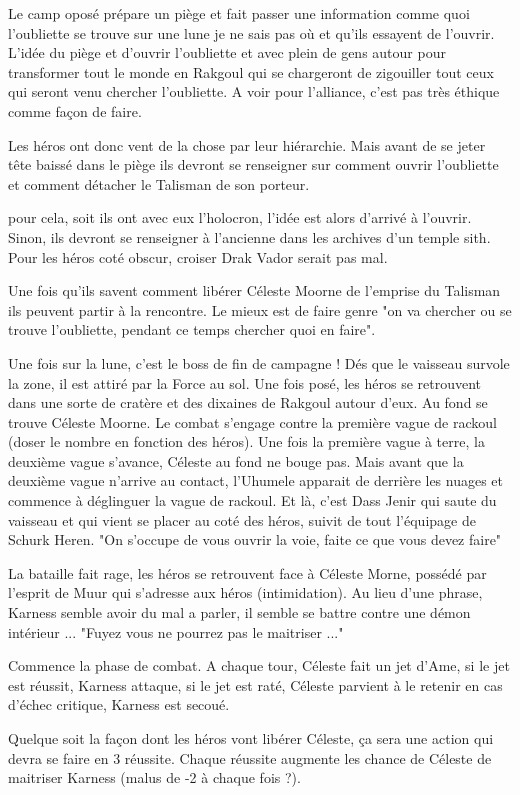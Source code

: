 Le camp oposé prépare un piège et fait passer une information comme quoi l’oubliette se trouve sur une lune je ne sais pas où et qu’ils essayent de l’ouvrir. L’idée du piège et d’ouvrir l’oubliette et avec plein de gens autour pour transformer tout le monde en Rakgoul qui se chargeront de zigouiller tout ceux qui seront venu chercher l’oubliette.
A voir pour l’alliance, c'est pas très éthique comme façon de faire.

Les héros ont donc vent de la chose par leur hiérarchie. Mais avant de se jeter tête baissé dans le piège ils devront se renseigner sur comment ouvrir l'oubliette et comment détacher le Talisman de son porteur.

pour cela, soit ils ont avec eux l'holocron, l'idée est alors d'arrivé à l'ouvrir. Sinon, ils devront se renseigner à l'ancienne dans les archives d'un temple sith. Pour les héros coté obscur, croiser Drak Vador serait pas mal.

Une fois qu'ils savent comment libérer Céleste Moorne de l'emprise du Talisman ils peuvent partir à la rencontre. Le mieux est de faire genre "on va chercher ou se trouve l'oubliette, pendant ce temps chercher quoi en faire".


Une fois sur la lune, c'est le boss de fin de campagne !
Dés que le vaisseau survole la zone, il est attiré par la Force au sol. Une fois posé, les héros se retrouvent dans une sorte de cratère et des dixaines de Rakgoul autour d'eux. Au fond se trouve Céleste Moorne. Le combat s'engage contre la première vague de rackoul (doser le nombre en fonction des héros). Une fois la première vague à terre, la deuxième vague s'avance, Céleste au fond ne bouge pas.
Mais avant que la deuxième vague n'arrive au contact, l'Uhumele apparait de derrière les nuages et commence à déglinguer la vague de rackoul. Et là, c'est Dass Jenir qui saute du vaisseau et qui vient se placer au coté des héros, suivit de tout l'équipage de Schurk Heren. "On s'occupe de vous ouvrir la voie, faite ce que vous devez faire"

La bataille fait rage, les héros se retrouvent face à Céleste Morne, possédé par l'esprit de Muur qui s'adresse aux héros (intimidation). Au lieu d'une phrase, Karness semble avoir du mal a parler, il semble se battre contre une démon intérieur ... "Fuyez vous ne pourrez pas le maitriser ..."

Commence la phase de combat. A chaque tour, Céleste fait un jet d'Ame, si le jet est réussit, Karness attaque, si le jet est raté, Céleste parvient à le retenir en cas d'échec critique, Karness est secoué.

Quelque soit la façon dont les héros vont libérer Céleste, ça sera une action qui devra se faire en 3 réussite. Chaque réussite augmente les chance de Céleste de maitriser Karness (malus de -2 à chaque fois ?). 